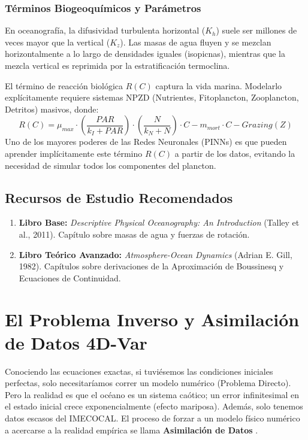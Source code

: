\documentclass[11pt,a4paper]{article}
\begin{document}
\subsubsection{Términos Biogeoquímicos y Parámetros}
En oceanografía, la difusividad turbulenta horizontal ($K_h$) suele ser millones de veces mayor que la vertical ($K_z$). Las masas de agua fluyen y se mezclan horizontalmente a lo largo de densidades iguales (isopicnas), mientras que la mezcla vertical es reprimida por la estratificación termoclina.

El término de reacción biológica $R(C)$ captura la vida marina. Modelarlo explícitamente requiere sistemas NPZD (Nutrientes, Fitoplancton, Zooplancton, Detritos) masivos, donde:
\begin{equation}
R(C) = \mu_{max} \cdot \left(\frac{PAR}{k_I + PAR}\right) \cdot \left(\frac{N}{k_N + N}\right) \cdot C - m_{mort} \cdot C - Grazing(Z)
\end{equation}
Uno de los mayores poderes de las Redes Neuronales (PINNs) es que pueden aprender implícitamente este término $R(C)$ a partir de los datos, evitando la necesidad de simular todos los componentes del plancton.

\subsection{Recursos de Estudio Recomendados}
\begin{enumerate}
    \item \textbf{Libro Base:} \textit{Descriptive Physical Oceanography: An Introduction} (Talley et al., 2011). Capítulo sobre masas de agua y fuerzas de rotación.
    \item \textbf{Libro Teórico Avanzado:} \textit{Atmosphere-Ocean Dynamics} (Adrian E. Gill, 1982). Capítulos sobre derivaciones de la Aproximación de Boussinesq y Ecuaciones de Continuidad.
\end{enumerate}

\newpage
\section{El Problema Inverso y Asimilación de Datos 4D-Var}

Conociendo las ecuaciones exactas, si tuviésemos las condiciones iniciales perfectas, solo necesitaríamos correr un modelo numérico (Problema Directo). Pero la realidad es que el océano es un sistema caótico; un error infinitesimal en el estado inicial crece exponencialmente (efecto mariposa). Además, solo tenemos datos escasos del IMECOCAL. El proceso de forzar a un modelo físico numérico a acercarse a la realidad empírica se llama \textbf{Asimilación de Datos} \cite{asch2016}.
\end{document}
